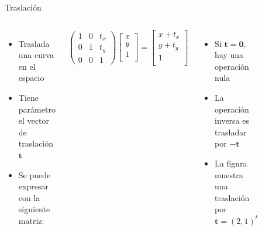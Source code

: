 \begin{frame}{Traslación}
\begin{columns}
\begin{itemize}
    \item Traslada una curva en el espacio
    \item Tiene parámetro el vector de traslación $\mathbf{t}$
    \item Se puede expresar con la siguiente matriz:
\end{itemize}
$$
\begin{pmatrix}
1 & 0 & t_x\\
0 & 1 & t_y\\
0 & 0 & 1
\end{pmatrix}
\begin{bmatrix}
x \\
y \\
1 \\
\end{bmatrix}
=
\begin{bmatrix}
x + t_x \\
y + t_y \\
1 \\
\end{bmatrix}
$$
\begin{itemize}
    \item Si $\mathbf{t} = \mathbf{0}$, hay una operación nula
    \item La operación inversa es trasladar por $-\mathbf{t}$
    \item La figura muestra una traslación por $\mathbf{t} = (2, 1)^t$
\end{itemize}
\begin{figure}[htp]
 \centering
 \begin{subfigure}[b]{0.4\textwidth}
   \includegraphics[width=\textwidth]{img/Square}

\end{subfigure}
\end{figure}
\end{columns}
\end{frame}
